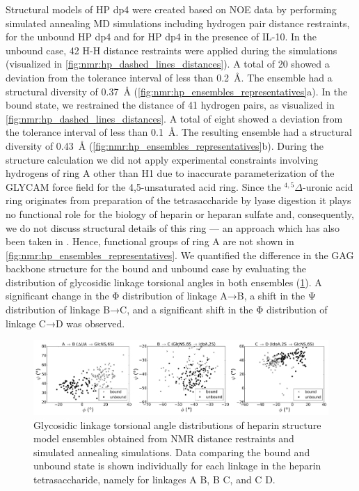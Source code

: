 Structural models of HP dp4 were created based on NOE data by performing
simulated annealing MD simulations including hydrogen pair distance restraints,
for the unbound HP dp4 and for HP dp4 in the presence of IL-10. In the unbound
case, 42 H-H distance restraints were applied during the simulations (visualized
in \cref{fig:nmr:hp_dashed_lines_distances}). A total of 20 showed a deviation
from the tolerance interval of less than \SI{0.2}{\angstrom}. The ensemble had a
structural diversity of \SI{0.37}{\angstrom}
(\cref{fig:nmr:hp_ensembles_representatives}a). In the bound state, we
restrained the distance of 41 hydrogen pairs, as visualized in
\cref{fig:nmr:hp_dashed_lines_distances}. A total of eight showed a deviation
from the tolerance interval of less than \SI{0.1}{\angstrom}. The resulting
ensemble had a structural diversity of \SI{0.43}{\angstrom}
(\cref{fig:nmr:hp_ensembles_representatives}b). During the structure calculation
we did not apply experimental constraints involving hydrogens of ring A other
than H1 due to inaccurate parameterization of the GLYCAM force field for the
4,5-unsaturated acid ring. Since the ${}^{4,5}\Delta$-uronic acid ring
originates from preparation of the tetrasaccharide by lyase digestion it plays
no functional role for the biology of heparin or heparan sulfate and,
consequently, we do not discuss structural details of this ring --- an approach
which has also been taken in \cite{jin_heparin_2009}. Hence, functional groups
of ring A are not shown in \cref{fig:nmr:hp_ensembles_representatives}. We
quantified the difference in the GAG backbone structure for the bound and
unbound case by evaluating the distribution of glycosidic linkage torsional
angles in both ensembles (\cref{fig:nmr:hp_glyco_dihedral_distributions}). A
significant change in the Φ distribution of linkage A→B, a shift in the Ψ
distribution of linkage B→C, and a significant shift in the Φ distribution of
linkage C→D was observed.


\begin{figure}
\begin{adjustwidth}{-2cm}{-2cm}
\centering
\includegraphics[width=1.3\textwidth]{gfx/nmr/Figure_08_glycolinkage_dihedrals_bound_vs_free_three_3panels_05.png}
\caption[]{
Glycosidic linkage torsional angle distributions of heparin structure model
ensembles obtained from NMR distance restraints and simulated annealing
simulations. Data comparing the bound and unbound state is shown individually
for each linkage in the heparin tetrasaccharide, namely for linkages A
\rightarrow B, B \rightarrow C, and C \rightarrow D.
}
\label{fig:nmr:hp_glyco_dihedral_distributions}
\end{adjustwidth}
\end{figure}

